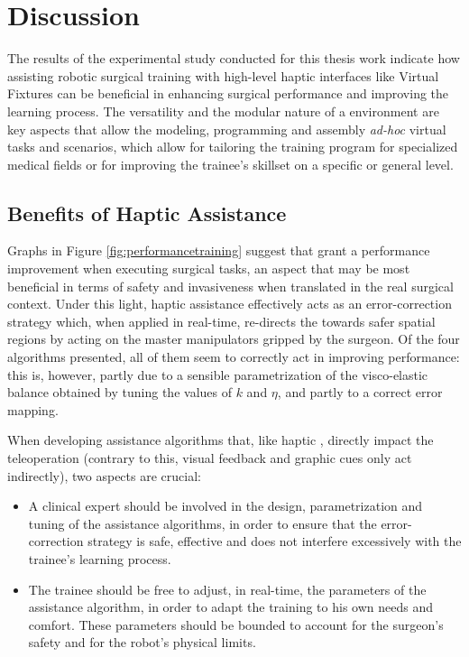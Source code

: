 \documentclass[../main.tex]{subfiles}
\begin{document}
\chapter{Discussion}
The results of the experimental study conducted for this thesis work indicate how assisting robotic surgical training with high-level haptic interfaces like Virtual Fixtures can be beneficial in enhancing surgical performance and improving the learning process. The versatility and the modular nature of a \vr environment are key aspects that allow the modeling, programming and assembly \textit{ad-hoc} virtual tasks and scenarios, which allow for tailoring the training program for specialized medical fields or for improving the trainee's skillset on a specific or general level.

\section{Benefits of Haptic Assistance}
Graphs in Figure \ref{fig:performancetraining} suggest that \vfs grant a performance improvement when executing surgical tasks, an aspect that may be most beneficial in terms of safety and invasiveness when translated in the real surgical context. Under this light, haptic assistance effectively acts as an error-correction strategy which, when applied in real-time, re-directs the \ee towards safer spatial regions by acting on the master manipulators gripped by the surgeon. Of the four algorithms presented, all of them seem to correctly act in improving performance: this is, however, partly due to a sensible parametrization of the visco-elastic balance obtained by tuning the values of $k$ and $\eta$, and partly to a correct error mapping. 

When developing assistance algorithms that, like haptic \vfs, directly impact the teleoperation (contrary to this, visual feedback and graphic cues only act indirectly), two aspects are crucial:

\begin{itemize}
    \item A clinical expert should be involved in the design, parametrization and tuning of the assistance algorithms, in order to ensure that the error-correction strategy is safe, effective and does not interfere excessively with the trainee's learning process. 
    \item The trainee should be free to adjust, in real-time, the parameters of the assistance algorithm, in order to adapt the training to his own needs and comfort. These parameters should be bounded to account for the surgeon's safety and for the robot's physical limits.
\end{itemize}
\end{document}
